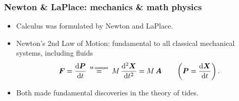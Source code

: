 \documentclass[10pt]{beamer}
\newcommand\myeq{\mathrel{\overset{\makebox[0pt]{\mbox{\normalfont\tiny\sffamily M constant}}}{=}}}
\begin{document}
\begin{frame}
  \frametitle{Newton \& LaPlace: mechanics \& math physics}

\begin{center}
\vspace{-.25cm}
\hspace{2cm} 
\end{center}

\begin{exampleblock}{}
\begin{itemize}
\item Calculus was formulated by Newton and LaPlace. 
\item Newton's 2nd Law of Motion: fundamental to all classical mechanical systems, including fluids 
\begin{equation}
   {\bm F} = \frac{\mathrm{d}{\bm P}}{\mathrm{d}t}  \; \; \; \;  \myeq \; \; \; \;   M \, \frac{\mathrm{d}^{2} {\bm X}}{\mathrm{d}t^{2}} = M \, {\bm A}
  \qquad \left( {\bm P} = \frac{\mathrm{d}{\bm X}}{\mathrm{d}t}   \right).
\end{equation}
\item Both made fundamental discoveries in the theory of tides. 
\end{itemize}
\end{exampleblock}{}


\end{frame}
\end{document}
